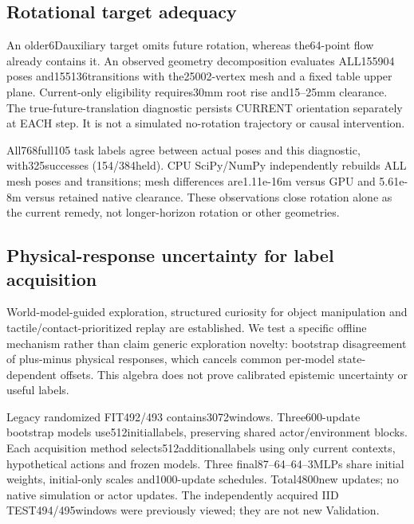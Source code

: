 \documentclass[10pt]{article}
\begin{document}
\clearpage
\subsection{Rotational target adequacy}
An older6Dauxiliary target omits future rotation, whereas the64-point flow
already contains it. An observed geometry decomposition evaluates ALL155904
poses and155136transitions with the25002-vertex mesh and a fixed table upper
plane. Current-only eligibility requires30mm root rise and15--25mm clearance.
The true-future-translation diagnostic persists CURRENT orientation separately
at EACH step. It is not a simulated no-rotation trajectory or causal intervention.
\begin{table}[ht]\centering\small

\caption{Equal-episode decision flips and weighted95th absolute rotational
clearance contribution. Held coverage and2mm magnitude gates pass;10\%flip
gate fails. Motion0has no eligible windows, so it was not assessed.}
\end{table}
All768full105 task labels agree between actual poses and this diagnostic,
with325successes (154/384held). CPU SciPy/NumPy independently rebuilds ALL
mesh poses and transitions; mesh differences are1.11e-16m versus GPU and
5.61e-8m versus retained native clearance. These observations close rotation
alone as the current remedy, not longer-horizon rotation or other geometries.

\clearpage
\subsection{Physical-response uncertainty for label acquisition}
World-model-guided exploration\cite{sekar2020}, structured curiosity for object
manipulation\cite{sancaktar2022} and tactile/contact-prioritized replay
\cite{vulin2021} are established. We test a specific offline mechanism rather
than claim generic exploration novelty: bootstrap disagreement of plus-minus
physical responses, which cancels common per-model state-dependent offsets.
This algebra does not prove calibrated epistemic uncertainty or useful labels.

Legacy randomized FIT492/493 contains3072windows. Three600-update bootstrap
models use512initiallabels, preserving shared actor/environment blocks. Each
acquisition method selects512additionallabels using only current contexts,
hypothetical actions and frozen models. Three final87--64--64--3MLPs share
initial weights, initial-only scales and1000-update schedules. Total4800new
updates; no native simulation or actor updates. The independently acquired
IID TEST494/495windows were previously viewed; they are not new Validation.
\end{document}
